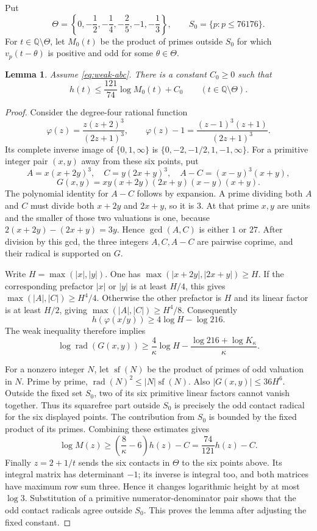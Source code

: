 \documentclass[11pt,a4paper]{article}
\newtheorem{lemma}[theorem]{Lemma}
\newcommand{\Q}{\mathbb Q}\newcommand{\Z}{\mathbb Z}
\begin{document}
Put
\[
 \Theta=\left\{0,-\frac12,-\frac14,-\frac25,-1,-\frac13\right\},
 \qquad S_0=\{p:p\le76176\}.
\]
For $t\in\Q\setminus\Theta$, let $M_0(t)$ be the product of
primes outside $S_0$ for which $v_p(t-\theta)$ is positive
and odd for some $\theta\in\Theta$.

\begin{lemma}\label{lem:contact}
Assume \eqref{eq:weak-abc}. There is a constant $C_0\ge0$ such that
\[
                    h(t)\le\frac{121}{74}\log M_0(t)+C_0
                  \qquad(t\in\Q\setminus\Theta).
\]
\end{lemma}
\begin{proof}
Consider the degree-four rational function
\[
 \varphi(z)=\frac{z(z+2)^3}{(2z+1)^3},\qquad
 \varphi(z)-1=\frac{(z-1)^3(z+1)}{(2z+1)^3}.
\]
Its complete inverse image of $\{0,1,\infty\}$ is
$\{0,-2,-1/2,1,-1,\infty\}$. For a primitive integer pair
$(x,y)$ away from these six points, put
\[
 A=x(x+2y)^3,\quad C=y(2x+y)^3,\quad
 A-C=(x-y)^3(x+y),
\]
\[
                G(x,y)=xy(x+2y)(2x+y)(x-y)(x+y).
\]
The polynomial identity for $A-C$ follows by expansion.
A prime dividing both $A$ and $C$ must divide both $x+2y$
and $2x+y$, so it is $3$. At that prime $x,y$ are units
and the smaller of those two valuations is one, because
$2(x+2y)-(2x+y)=3y$. Hence $\gcd(A,C)$ is either $1$ or $27$.
After division by this gcd, the three integers $A,C,A-C$
are pairwise coprime, and their radical is supported on $G$.

Write $H=\max(|x|,|y|)$. One has
$\max(|x+2y|,|2x+y|)\ge H$. If the corresponding prefactor
$|x|$ or $|y|$ is at least $H/4$, this gives
$\max(|A|,|C|)\ge H^4/4$. Otherwise the other prefactor
is $H$ and its linear factor is at least $H/2$, giving
$\max(|A|,|C|)\ge H^4/8$. Consequently
\[
                    h(\varphi(x/y))\ge4\log H-\log216.
\]
The weak inequality therefore implies
\[
 \log\operatorname{rad}(G(x,y))
       \ge\frac4\kappa\log H-\frac{\log216+\log K_\kappa}{\kappa}.
\]

For a nonzero integer $N$, let $\operatorname{sf}(N)$ be the
product of primes of odd valuation in $N$. Prime by prime,
$\operatorname{rad}(N)^2\le |N|\operatorname{sf}(N)$.
Also $|G(x,y)|\le36H^6$. Outside the fixed set $S_0$, two
of its six primitive linear factors cannot vanish together.
Thus its squarefree part outside $S_0$ is precisely the odd
contact radical for the six displayed points. The contribution
from $S_0$ is bounded by the fixed product of its primes.
Combining these estimates gives
\[
 \log M(z)\ge\left(\frac8\kappa-6\right)h(z)-C
             =\frac{74}{121}h(z)-C.
\]
Finally $z=2+1/t$ sends the six contacts in $\Theta$ to the
six points above. Its integral matrix has determinant $-1$;
its inverse is integral too, and both matrices have maximum
row sum three. Hence it changes logarithmic height by at most
$\log3$. Substitution of a primitive numerator-denominator pair
shows that the odd contact radicals agree outside $S_0$.
This proves the lemma after adjusting the fixed constant.
\end{proof}
\end{document}
